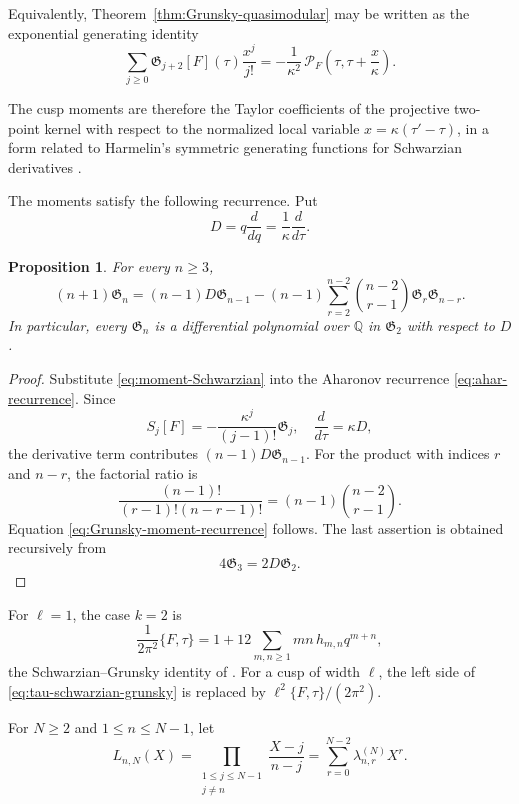 \documentclass[11pt]{amsart}
\newtheorem{prop}[thm]{Proposition}
\theoremstyle{definition}
\theoremstyle{remark}
\numberwithin{equation}{section}
\begin{document}
Equivalently, Theorem~\ref{thm:Grunsky-quasimodular} may be written as the exponential generating identity
\begin{equation*}
\sum_{j\geq0}\mathfrak G_{j+2}[F](\tau)\frac{x^j}{j!}
=
-\frac1{\kappa^2}\,
\mathcal P_F\!\left(\tau,\tau+\frac{x}{\kappa}\right).
\end{equation*}

The cusp moments are therefore the Taylor coefficients of the projective two-point kernel with respect to the normalized local variable \(x=\kappa(\tau'-\tau)\), in a form related to Harmelin's symmetric generating functions for Schwarzian derivatives \cite{harmelin-derivatives}.

The moments satisfy the following recurrence. Put
\[
D=q\frac{d}{dq}=\frac1\kappa\frac{d}{d\tau}.
\]

\begin{prop}\label{prop:Grunsky-moment-recurrence}
For every $n\geq3$,
\begin{equation}\label{eq:Grunsky-moment-recurrence}
(n+1)\mathfrak G_n
=
(n-1)D\mathfrak G_{n-1}
-(n-1)\sum_{r=2}^{n-2}
\binom{n-2}{r-1}\mathfrak G_r\mathfrak G_{n-r}.
\end{equation}
In particular, every $\mathfrak G_n$ is a differential polynomial over $\mathbb Q$ in $\mathfrak G_2$ with respect to $D$.
\end{prop}

\begin{proof}
Substitute \eqref{eq:moment-Schwarzian} into the Aharonov recurrence \eqref{eq:ahar-recurrence}. Since
\[
S_j[F]= -\frac{\kappa^j}{(j-1)!}\mathfrak G_j,
\quad
\frac{d}{d\tau}=\kappa D,
\]
the derivative term contributes $(n-1)D\mathfrak G_{n-1}$. For the product with indices $r$ and $n-r$, the factorial ratio is
\[
\frac{(n-1)!}{(r-1)!(n-r-1)!}
=(n-1)\binom{n-2}{r-1}.
\]
Equation \eqref{eq:Grunsky-moment-recurrence} follows. The last assertion is obtained recursively from
\[
4\mathfrak G_3=2D\mathfrak G_2.
\]
\end{proof}

For $\ell=1$, the case $k=2$ is
\begin{equation}\label{eq:tau-schwarzian-grunsky}
\frac1{2\pi^2}\{F,\tau\}
=
1+12\sum_{m,n\geq1}mn\,h_{m,n}q^{m+n},
\end{equation}
the Schwarzian--Grunsky identity of \cite{mckay-sebbar-replicable}. For a cusp of width $\ell$, the left side of \eqref{eq:tau-schwarzian-grunsky} is replaced by $\ell^2\{F,\tau\}/(2\pi^2)$.

For $N\geq2$ and $1\leq n\leq N-1$, let
\begin{equation*}
L_{n,N}(X)
=
\prod_{\substack{1\leq j\leq N-1\\ j\neq n}}
\frac{X-j}{n-j}
=
\sum_{r=0}^{N-2}\lambda_{n,r}^{(N)}X^r.
\end{equation*}
\end{document}
